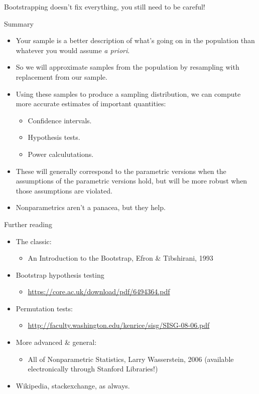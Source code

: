\documentclass{beamer} %
\begin{document}
\begin{frame}[standout]
Bootstrapping doesn't fix everything, you still need to be careful! 
\end{frame}

\begin{frame}{Summary}
\begin{itemize}
\item Your sample is a better description of what's going on in the population than whatever you would assume \textit{a priori}.
\item So we will approximate samples from the population by resampling with replacement from our sample.
\item Using these samples to produce a sampling distribution, we can compute more accurate estimates of important quantities:%
    \begin{itemize}
    \item Confidence intervals.
    \item Hypothesis tests.
    \item Power calculutations.
    \end{itemize}
\item These will generally correspond to the parametric versions when the assumptions of the parametric versions hold, but will be more robust when those assumptions are violated.
\item Nonparametrics aren't a panacea, but they help. 
\end{itemize}
\end{frame}

\begin{frame}{Further reading}
\begin{itemize}
\item The classic:
    \begin{itemize}
    \item An Introduction to the Bootstrap, Efron \& Tibshirani, 1993
    \end{itemize}
\item Bootstrap hypothesis testing 
    \begin{itemize}
    \item \url{https://core.ac.uk/download/pdf/6494364.pdf} 
    \end{itemize}
\item Permutation tests:
    \begin{itemize}
    \item \url{http://faculty.washington.edu/kenrice/sisg/SISG-08-06.pdf} 
    \end{itemize}
\item More advanced \& general: 
    \begin{itemize}
    \item All of Nonparametric Statistics, Larry Wasserstein, 2006 (available electronically through Stanford Libraries!)
    \end{itemize}
\item Wikipedia, stackexchange, as always.
\end{itemize}
\end{frame}
\end{document}
